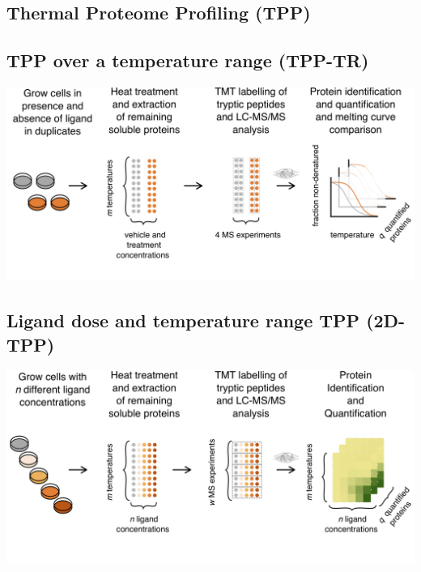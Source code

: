 \documentclass{article}
\begin{document}
\setlength{\columnsep}{0.5cm}
\begin{multicols}{2}

\noindent
\begin{minipage}[t]{\linewidth}
  \vspace{0.5cm}
  \section*{\huge Thermal Proteome Profiling (TPP)}
  \subsection*{TPP over a temperature range (TPP-TR) \cite{savitski_2014}}
  
  \includegraphics[width=\linewidth]{figs/tpp-tr_schematic.png}

  \subsection*{Ligand dose and temperature range TPP (2D-TPP) \cite{becher_2016}}
  
  \includegraphics[width=\linewidth]{figs/2d-tpp_schematic.png}
\end{minipage}


\end{multicols}
\end{document}

